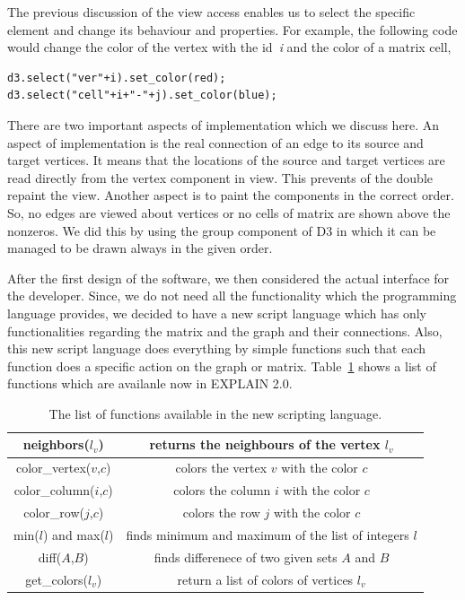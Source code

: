 \documentclass[12pt, oneside]{book}
\begin{document}
The previous discussion of the view access enables us to select the 
specific element and change its behaviour and properties. For example, the following 
code would change the color of the vertex with the id~\textit{i} and the color
of a matrix cell,
\begin{lstlisting}
d3.select("ver"+i).set_color(red);
d3.select("cell"+i+"-"+j).set_color(blue);
\end{lstlisting}

There are two important aspects of implementation which we discuss here. 
An aspect of implementation is the real connection of an edge to its
source and target vertices. It means that the locations of the source and target
vertices are read directly from the vertex component in view. This prevents 
of the double repaint the view.
Another aspect is to paint the components in the correct order. So, no edges
are viewed about vertices or no cells of matrix are shown above the nonzeros. 
We did this by using the group component of D3 in which it can be managed
to be drawn always in the given order.

After the first design of the software, we then considered the actual interface
for the developer. Since, we do not need all the functionality which the 
programming language provides, we decided to have a new script language which
has only functionalities regarding the matrix and the graph and their
connections. Also, this new script language does everything by simple functions
such that each function does a specific action on the graph or matrix.
Table~\ref{command-table} shows a list of functions which are availanle
now in EXPLAIN 2.0.
\begin{table}
  \begin{tabular}{ | c | c |}
    \hline
    neighbors($l_v$) & returns the neighbours of the vertex $l_v$  \\ \hline
    color\_vertex($v$,$c$) & colors the vertex $v$ with the color $c$  \\\hline
    color\_column($i$,$c$) & colors the column $i$ with the color $c$  \\\hline
    color\_row($j$,$c$)    & colors the row $j$ with the color $c$  \\\hline
    min($l$) and max($l$) & finds minimum and maximum of the list of integers $l$ \\\hline
    diff($A$,$B$) & finds differenece of two given sets $A$ and $B$ \\\hline
    get\_colors($l_v$) & return a list of colors of vertices $l_v$ \\\hline
\end{tabular}
\caption{The list of functions available in the new scripting language.}
\label{command-table}  
\end{table}
\end{document}

